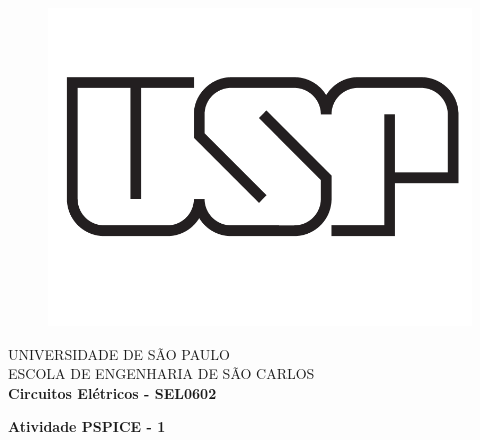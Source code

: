 \thispagestyle{empty}

\begin{figure}
  \centering
  \includegraphics[scale=0.2]{images/titlepage.png} %
  \vspace*{-0.3cm}
\end{figure}


\begin{center}
    \vspace*{-2cm}
\MakeUppercase{\Large{Universidade de São Paulo}} \\
\MakeUppercase{\Large{Escola de Engenharia de São Carlos}}\\
{\large \rm \textbf {Circuitos Elétricos - SEL0602} \linebreak} %
\end{center}

\baselineskip 30pt

\vspace*{0.3cm}

\begin{center}
    {\LARGE \bfseries Atividade PSPICE - 1} %
\end{center}

